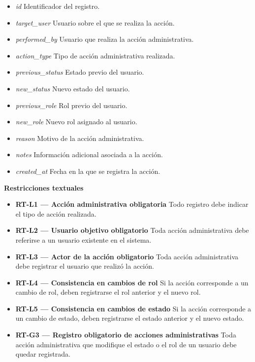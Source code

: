 \begin{itemize}

      \item \textit{id}
            Identificador del registro.
      \item \textit{target\_user}
            Usuario sobre el que se realiza la acción.
      \item \textit{performed\_by}
            Usuario que realiza la acción administrativa.
      \item \textit{action\_type}
            Tipo de acción administrativa realizada.
      \item \textit{previous\_status}
            Estado previo del usuario.
      \item \textit{new\_status}
            Nuevo estado del usuario.
      \item \textit{previous\_role}
            Rol previo del usuario.
      \item \textit{new\_role}
            Nuevo rol asignado al usuario.
      \item \textit{reason}
            Motivo de la acción administrativa.
      \item \textit{notes}
            Información adicional asociada a la acción.
      \item \textit{created\_at}
            Fecha en la que se registra la acción.

\end{itemize}

\textbf{Restricciones textuales}

\begin{itemize}

      \item \textbf{RT-L1 — Acción administrativa obligatoria}
            Todo registro debe indicar el tipo de acción realizada.
      \item \textbf{RT-L2 — Usuario objetivo obligatorio}
            Toda acción administrativa debe referirse a un usuario existente en el sistema.
      \item \textbf{RT-L3 — Actor de la acción obligatorio}
            Toda acción administrativa debe registrar el usuario que realizó la acción.
      \item \textbf{RT-L4 — Consistencia en cambios de rol}
            Si la acción corresponde a un cambio de rol, deben registrarse el rol anterior y el nuevo rol.
      \item \textbf{RT-L5 — Consistencia en cambios de estado}
            Si la acción corresponde a un cambio de estado, deben registrarse el estado anterior y el nuevo estado.
      \item \textbf{RT-G3 — Registro obligatorio de acciones administrativas}
            Toda acción administrativa que modifique el estado o el rol de un usuario debe quedar registrada.

\end{itemize}

